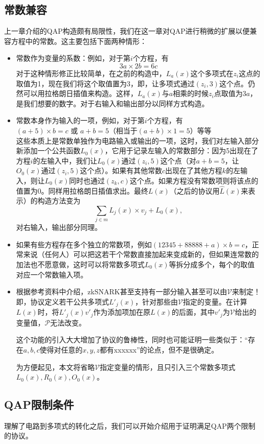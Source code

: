 \documentclass[12pt]{article}
\newcommand{\zk}{zkSNARK}
\newcommand{\pp}{$\mathcal{P}$}
\newcommand{\vv}{$\mathcal{V}$}
\begin{document}
\subsection{常数兼容}
上一章介绍的QAP构造颇有局限性，我们在这一章对QAP进行稍微的扩展以便兼容方程中的常数。这主要包括下面两种情形：
\begin{itemize}
	\item 常数作为变量的系数：例如，对于第$i$个方程，有
	         $$3a \times 2b = 6c$$
	         对于这种情形修正比较简单，在之前的构造中，$L_a(x)$这个多项式在$z_i$这点的取值为1，现在我们将这个取值置为3，即，让多项式通过$(z_i,3)$这个点。仍然可以用拉格朗日插值来构造。这样，$L_a(x)$与$a$相乘的时候$z_i$点取值为$3a$，是我们想要的数字。对于右输入和输出部分以同样方式构造。
	 \item 常数本身作为输入的一项，例如，对于第$i$个方程，有\\
	         $(a+5)\times b =c$ 或 $a+b=5$（相当于$(a+b)\times 1=5$）等等\\
	         这些本质上是常数单独作为电路输入或输出的一项，这时，我们对左输入部分新添加一个公共函数$L_0(x)$，它用于记录左输入的常数部分：因为5出现在了方程$i$的左输入中，我们让$L_0(x)$通过$(z_i,5)$这个点（对$a+b=5$，让$O_0(x)$通过$(z_i,5)$这个点）。如果有其他常数$c$出现在了其他方程$k$的左输入，则让$L_0(x)$同时也通过$(z_k,c)$这个点。如果方程没有常数项则将该点的值置为0。同样用拉格朗日插值求出。最终$L(x)$（之后的协议用$\hat{L}(x)$来表示）的构造方法变为
	         $$\sum_{j \in m} L_j(x)\times v_j+L_0(x),$$
	         对右输入，输出部分同理。
	 \item 如果有些方程存在多个独立的常数项，例如$(12345+88888+a)\times b = c $，正常来说（任何人）可以把这若干个常数直接加起来变成新的，但如果连常数的加法也不愿意做，这时可以将常数多项式$L_0(x)$等拆分成多个，每个的取值对应一个常数输入项。
	 \item 根据参考资料中介绍，\zk 甚至支持有一部分输入甚至可以由\vv 来制定！即，协议定义若干公共多项式$L'_j(x)$，针对那些由\vv 指定的变量。在计算$L(x)$时，将$L'_j(x)v'_j$作为添加项加在原$L(x)$的后面，其中$v'_j$为\vv 给出的变量值，\pp 无法改变。
	 
	 这个功能的引入大大增加了协议的鲁棒性，{\color{red}同时也可能证明一些类似于：“存在$a,b,c$使得对任意的$x,y,z$都有xxxxxx”的论点，但不是很确定}。
	 
	 为方便起见，本文将省略\vv 指定变量的情形，且只引入三个常数多项式$L_0(x),R_0(x),O_0(x)$。
\end{itemize}

\subsection{QAP限制条件}
理解了电路到多项式的转化之后，我们可以开始介绍用于证明满足QAP两个限制的协议。
\end{document}
